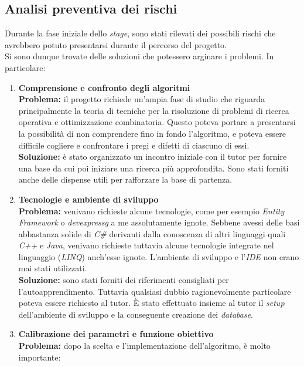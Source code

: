\subsection{Analisi preventiva dei rischi}
Durante la fase iniziale dello \textit{stage}, sono stati rilevati dei possibili rischi che avrebbero potuto presentarsi
durante il percorso del progetto.\\
Si sono dunque trovate delle soluzioni che potessero arginare i problemi. In particolare:
\begin{enumerate}
    \item \textbf{Comprensione e confronto degli algoritmi}\\[0.2cm]
    \textbf{Problema:} il progetto richiede un'ampia fase di studio che riguarda principalmente la teoria
    di tecniche per la risoluzione di problemi di ricerca operativa e ottimizzazione combinatoria.
    Questo poteva portare a presentarsi la possibilità di non comprendere fino in fondo l'algoritmo, e poteva essere difficile cogliere e confrontare
    i pregi e difetti di ciascuno di essi.\\[0.2cm]
    \textbf{Soluzione:} è stato organizzato un incontro iniziale con il tutor per fornire una base da cui poi iniziare una ricerca più approfondita.
    Sono stati forniti anche delle dispense utili per rafforzare la base di partenza.
    \item \textbf{Tecnologie e ambiente di sviluppo}\\[0.2cm]
    \textbf{Problema:} venivano richieste alcune tecnologie, come per esempio \textit{Entity Framework} o \textit{\gls{devexpressg}} a me assolutamente ignote.
    Sebbene avessi delle basi abbastanza solide di \textit{C\#} derivanti dalla conoscenza di altri linguaggi quali \textit{C++} e \textit{Java}, venivano richieste tuttavia
    alcune tecnologie integrate nel linguaggio (\textit{LINQ}) anch'esse ignote. L'ambiente di sviluppo e l'\textit{IDE} non erano mai stati utilizzati.\\[0.2cm]
    \textbf{Soluzione:} sono stati forniti dei riferimenti consigliati per l'autoapprendimento. Tuttavia qualsiasi dubbio ragionevolmente particolare
    poteva essere richiesto al tutor. È stato effettuato insieme al tutor il \textit{setup} dell'ambiente di sviluppo e la conseguente creazione dei \textit{database}.
    \item \textbf{Calibrazione dei parametri e funzione obiettivo}\\[0.2cm]
    \textbf{Problema:} dopo la scelta e l'implementazione dell'algoritmo, è molto importante:

\end{enumerate}
